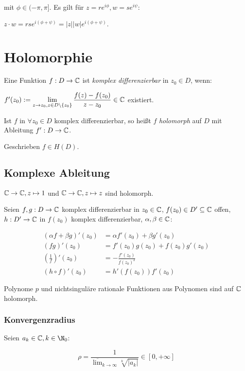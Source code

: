 mit $\phi \in (-\pi, \pi]$. Es gilt für $z = re^{i\phi}, w = se^{i\psi}$:

$z \cdot w = rse^{i(\phi+\psi)} = |z||w|e^{i(\phi+\psi)}$.

\section*{Holomorphie}

Eine Funktion $f : D \to \mathbb{C}$ ist \emph{komplex differenzierbar} in $z_0 \in D$, wenn:

$f'(z_0) := \displaystyle\lim_{z \to z_0, z \in D\setminus\{z_0\}} \frac{f(z)-f(z_0)}{z-z_0} \in \mathbb{C}$ existiert.

Ist $f$ in $\forall z_0 \in D$ komplex differenzierbar, so heißt $f$ \emph{holomorph} auf $D$ mit Ableitung $f' : D \to \mathbb{C}$.

Geschrieben $f \in H(D)$.

\subsection*{Komplexe Ableitung}

$\mathbb{C} \to \mathbb{C}, z \mapsto 1$ und $\mathbb{C} \to \mathbb{C}, z \mapsto z$ sind holomorph.

Seien $f, g : D \to \mathbb{C}$ komplex differenzierbar in $z_0 \in \mathbb{C}$, $f(z_0) \in D' \subseteq \mathbb{C}$ offen, $h : D' \to \mathbb{C}$ in $f(z_0)$ komplex differenzierbar, $\alpha, \beta \in \mathbb{C}$:

\vspace*{-4mm}
\begin{align*}
	(\alpha f + \beta g)'(z_0) &= \alpha f'(z_0) + \beta g'(z_0) \\
	(fg)'(z_0) &= f'(z_0)g(z_0) + f(z_0)g'(z_0) \\
	\left(\frac{1}{f}\right)'(z_0) &= -\frac{f'(z_0)}{f(z_0)^2} \\
	(h \circ f)'(z_0) &= h'(f(z_0))f'(z_0)
\end{align*}

Polynome $p$ und nichtsinguläre rationale Funktionen aus Polynomen sind auf $\mathbb{C}$ holomorph.

\subsubsection*{Konvergenzradius}

Seien $a_k \in \C, k \in \N_0$:

\vspace*{-2mm}
$$\rho = \frac{1}{\overline\lim_{k\to\infty} \sqrt[k]{|a_k|}} \in [0,+\infty]$$

